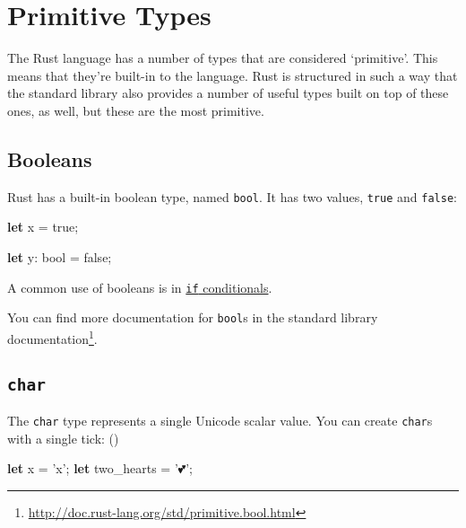 \documentclass[a4paper,]{book}
\newenvironment{Shaded}{\begin{snugshade}}{\end{snugshade}}
\newcommand{\KeywordTok}[1]{\textcolor[rgb]{0.13,0.29,0.53}{\textbf{{#1}}}}
\newcommand{\DataTypeTok}[1]{\textcolor[rgb]{0.13,0.29,0.53}{{#1}}}
\newcommand{\ConstantTok}[1]{\textcolor[rgb]{0.00,0.00,0.00}{{#1}}}
\newcommand{\CharTok}[1]{\textcolor[rgb]{0.31,0.60,0.02}{{#1}}}
\newcommand{\NormalTok}[1]{{#1}}
\renewcommand{\href}[2]{#2\footnote{\url{#1}}}
\begin{document}
\section{Primitive Types}\label{sec--primitive-types}

The Rust language has a number of types that are considered `primitive'.
This means that they're built-in to the language. Rust is structured in
such a way that the standard library also provides a number of useful
types built on top of these ones, as well, but these are the most
primitive.

\subsection{Booleans}\label{booleans}

Rust has a built-in boolean type, named \texttt{bool}. It has two
values, \texttt{true} and \texttt{false}:

\begin{Shaded}
\begin{Highlighting}[]
\KeywordTok{let} \NormalTok{x = }\ConstantTok{true}\NormalTok{;}

\KeywordTok{let} \NormalTok{y: }\DataTypeTok{bool} \NormalTok{= }\ConstantTok{false}\NormalTok{;}
\end{Highlighting}
\end{Shaded}

A common use of booleans is in \protect\hyperlink{sec--if}{\texttt{if}
conditionals}.

You can find more documentation for \texttt{bool}s
\href{http://doc.rust-lang.org/std/primitive.bool.html}{in the standard
library documentation}.

\subsection{\texorpdfstring{\texttt{char}}{char}}\label{char}

The \texttt{char} type represents a single Unicode scalar value. You can
create \texttt{char}s with a single tick: (\texttt{\textquotesingle{}})

\begin{Shaded}
\begin{Highlighting}[]
\KeywordTok{let} \NormalTok{x = }\CharTok{'x'}\NormalTok{;}
\KeywordTok{let} \NormalTok{two_hearts = }\CharTok{'💕'}\NormalTok{;}
\end{Highlighting}
\end{Shaded}
\end{document}
